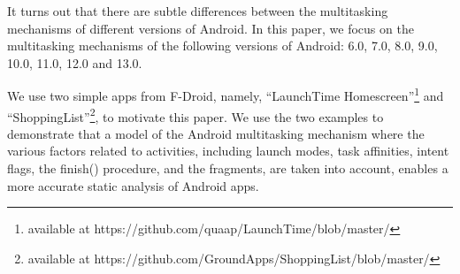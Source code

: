 It turns out that there are subtle differences between the multitasking mechanisms of different versions of Android. In this paper, we focus on the multitasking mechanisms of the following versions of Android: 6.0, 7.0, 8.0, 9.0, 10.0, 11.0, 12.0 and 13.0. 

%

%
We use two simple apps from F-Droid, namely, ``LaunchTime Homescreen''\footnote{available at https://github.com/quaap/LaunchTime/blob/master/} and ``ShoppingList''\footnote{available at https://github.com/GroundApps/ShoppingList/blob/master/}, to motivate this paper. We use the two examples to demonstrate that a model of the Android multitasking mechanism where the various factors related to activities, including launch modes, task affinities, intent flags, the finish() procedure, and the fragments, are taken into account, enables a more accurate static analysis of Android apps.  
%
